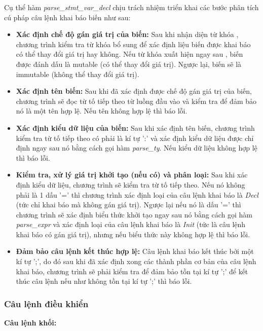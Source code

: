 Cụ thể hàm \textit{parse\_stmt\_var\_decl} chịu trách nhiệm triển khai các bước phân tích cú pháp câu lệnh khai báo biến như sau:

\begin{itemize}
    \item \textbf{Xác định chế độ gán giá trị của biến:}
    Sau khi nhận diện từ khóa , chương trình kiểm tra từ khóa bổ sung để xác định liệu biến được khai báo có thể thay đổi giá trị hay không. Nếu từ khóa  xuất hiện ngay sau , biến được đánh dấu là mutable (có thể thay đổi giá trị). Ngược lại, biến sẽ là immutable (không thể thay đổi giá trị).
    \item \textbf{Xác định tên biến:}
    Sau khi đã xác định được chế độ gán giá trị của biến, chương trình sẽ đọc từ tố tiếp theo từ luồng đầu vào và kiểm tra để đảm bảo nó là một tên hợp lệ. Nếu tên không hợp lệ thì báo lỗi. %
    \item \textbf{Xác định kiểu dữ liệu của biến:}
    Sau khi xác định tên biến, chương trình kiểm tra từ tố tiếp theo có phải là kí tự ':' và xác định kiểu dữ liệu được chỉ định ngay sau nó bằng cách gọi hàm \textit{parse\_ty}. Nếu kiểu dữ liệu không hợp lệ thì báo lỗi. %
    \item \textbf{Kiểm tra, xử lý giá trị khởi tạo (nếu có) và phân loại:}
    Sau khi xác định kiểu dữ liệu, chương trình sẽ kiểm tra từ tố tiếp theo. Nếu nó không phải là 1 dấu '=' thì chương trình xác định loại của câu lệnh khai báo là \textit{Decl} (tức chỉ khai báo mà không gán giá trị). Ngược lại nếu nó là dấu '=' thì chương trình sẽ xác định biểu thức khởi tạo ngay sau nó bằng cách gọi hàm \textit{parse\_expr} và xác định loại của câu lệnh khai báo là \textit{Init} (tức là câu lệnh khai báo có gán giá trị), nhưng nếu biểu thức này không hợp lệ thì báo lỗi. %
    \item \textbf{Đảm bảo câu lệnh kết thúc hợp lệ:}
    Câu lệnh khai báo kết thúc bởi một kí tự ';', do đó sau khi đã xác định xong các thành phần cơ bản của câu lệnh khai báo, chương trình sẽ phải kiểm tra để đảm bảo tồn tại kí tự ';' để kết thúc câu lệnh nếu như không tồn tại kí tự ';' thì báo lỗi. %
\end{itemize}


\subsubsection{Câu lệnh điều khiển}
\textbf{Câu lệnh khối:} 


